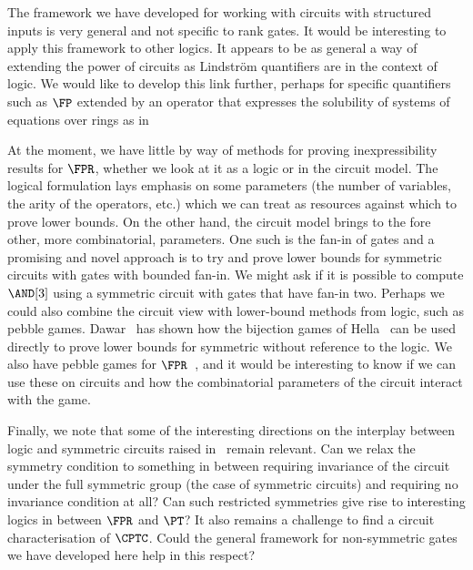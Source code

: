 \documentclass[a4paper,UKenglish]{lipics-v2018}
\begin{document}
The framework we have developed for working with circuits with structured inputs
is very general and not specific to rank gates. It
would be interesting to apply this framework to other logics. It appears to be
as general a way of extending the power of circuits as Lindstr\"om quantifiers
are in the context of logic. We would like to develop this link further, perhaps
for specific quantifiers such as $\FP$ extended by an operator that expresses
the solubility of systems of equations over rings as in~\cite{DGHKP}

At the moment, we have little by way of methods for proving inexpressibility
results for $\FPR$, whether we look at it as a logic or in the circuit model.
The logical formulation lays emphasis on some parameters (the number of
variables, the arity of the operators, etc.) which we can treat as resources
against which to prove lower bounds. On the other hand, the circuit model brings
to the fore other, more combinatorial, parameters. One such is the fan-in of
gates and a promising and novel approach is to try and prove lower bounds for
symmetric circuits with gates with bounded fan-in. We might ask if it is
possible to compute $\AND[3]$ using a symmetric circuit with gates that have
fan-in two. Perhaps we could also combine the circuit view with lower-bound
methods from logic, such as pebble games. Dawar~\cite{Dawar2016} has shown how
the bijection games of Hella~\cite{Hella19961} can be used directly to prove
lower bounds for symmetric without reference to the logic. We also have pebble
games for $\FPR$~\cite{DawarH2012}, and it would be interesting to know if we
can use these on circuits and how the combinatorial parameters of the circuit
interact with the game.

Finally, we note that some of the interesting directions on the interplay
between logic and symmetric circuits raised in~\cite{AndersonD17} remain
relevant. Can we relax the symmetry condition to something in between requiring
invariance of the circuit under the full symmetric group (the case of symmetric
circuits) and requiring no invariance condition at all? Can such restricted
symmetries give rise to interesting logics in between $\FPR$ and $\PT$? It also
remains a challenge to find a circuit characterisation of $\CPTC$. Could the
general framework for non-symmetric gates we have developed here help in this
respect?



% 
\end{document}
